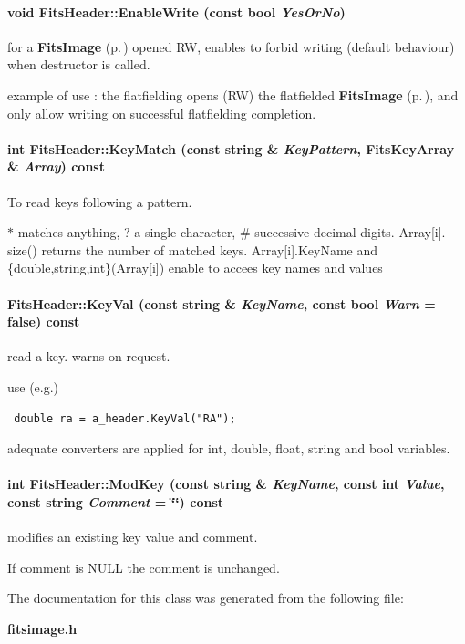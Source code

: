 \paragraph{\setlength{\rightskip}{0pt plus 5cm}void Fits\-Header::Enable\-Write (const bool {\em Yes\-Or\-No})}\hfill\label{class_fitsheader_a45}


for a {\bf Fits\-Image} {\rm (p.\,\pageref{class_fitsimage})} opened RW, enables to forbid writing (default behaviour) when destructor is called.

example of use : the flatfielding opens (RW) the flatfielded {\bf Fits\-Image} {\rm (p.\,\pageref{class_fitsimage})}, and  only allow writing on successful flatfielding completion. 
\paragraph{\setlength{\rightskip}{0pt plus 5cm}int Fits\-Header::Key\-Match (const string \& {\em Key\-Pattern}, Fits\-Key\-Array \& {\em Array}) const}\hfill\label{class_fitsheader_a22}


To read keys following a pattern.

$\ast$ matches anything, ? a single character, \# successive decimal digits. Array[i]. size() returns the number of matched keys. Array[i].Key\-Name and \{double,string,int\}(Array[i]) enable to accees  key names and values 
\paragraph{ Fits\-Header::Key\-Val (const string \& {\em Key\-Name}, const bool {\em Warn} = false) const}\hfill\label{class_fitsheader_a7}


read a key. warns on request.

use (e.g.) \footnotesize\begin{verbatim} double ra = a_header.KeyVal("RA"); \end{verbatim}\normalsize 
 adequate converters are applied for int, double, float, string and bool variables. 
\paragraph{\setlength{\rightskip}{0pt plus 5cm}int Fits\-Header::Mod\-Key (const string \& {\em Key\-Name}, const int {\em Value}, const string {\em Comment} = \char`\"{}\char`\"{}) const}\hfill\label{class_fitsheader_a9}


modifies an existing key value and comment.

If comment is NULL the comment is unchanged. 

The documentation for this class was generated from the following file:\begin{CompactItemize}
\item 
{\bf fitsimage.h}\end{CompactItemize}
